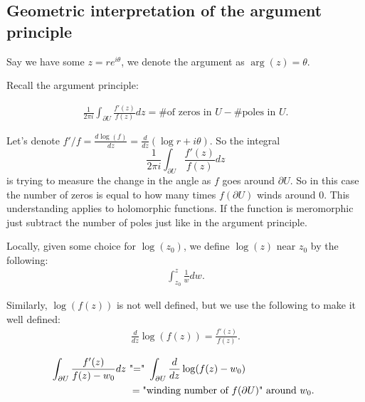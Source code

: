 \documentclass{article}
\begin{document}
\subsection{Geometric interpretation of the argument principle}

Say we have some \( z = re ^{i \theta }  \), we denote the argument as \( \arg (z) = \theta\).

Recall the argument principle:

\begin{align*}
    \frac{1}{2\pi i}\int _{\partial U} \frac{f'(z)}{f(z)} dz = \text{\# of zeros in } U  - \text{\# poles in } U .
\end{align*}

Let's denote \( f'/f = \frac{d\log (f)}{dz} = \frac{d}{dz}(\log r + i \theta )    \). So the integral 
\[
    \frac{1}{2\pi i}\int _{\partial U} \frac{f'(z)}{f(z)} dz
\]
is trying to measure the change in the angle as \( f \) goes around \( \partial U \). So in this case the number of zeros is equal to how many times \( f(\partial U) \) winds around \( 0 \). This understanding applies to holomorphic functions. If the function is meromorphic just subtract the number of poles just like in the argument principle. 

Locally, given some choice for \( \log (z_0) \), we define \( \log (z) \) near \( z_0  \) by the following:
\begin{align*}
    \int _{z_0}^z \frac{1}{w}dw.
\end{align*}

Similarly, \( \log (f(z)) \) is not well defined, but we use the following to make it well defined:
\begin{align*}
    \frac{d}{dz}\log (f(z)) = \frac{f'(z)}{f(z)} .
\end{align*}

\begin{align*}
    \int _{\partial U}\frac{f'(z)}{f(z) - w_0} dz &\text{ "\( = \)" } \int   _{\partial U}\frac{d}{dz} \log (f(z) - w_0) \\
    &  \ = \text{"winding number of \( f(\partial U) \)" around \( w_0 \).  }
\end{align*}
\end{document}
